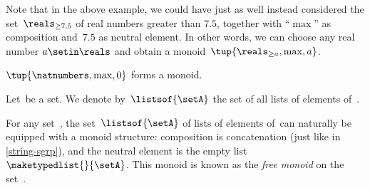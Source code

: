 \begin{remark}
    Note that in the above example, we could have just as well instead considered the set~$\reals_{\geq 7.5}$ of real numbers greater than $7.5$, together with ``$\max$'' as composition and~$7.5$ as neutral element.
    In other words, we can choose any real number $a \setin \reals$ and obtain a monoid~$\tup{\reals_{\geq a},\max, a}$.
\end{remark}

\begin{example}
    $\tup{\natnumbers, \max,0}$ forms a monoid.
\end{example}

\begin{definition}
    \label{def:set-of-lists}
    Let~\setA be a set.
    We denote by~$\listsof{\setA}$ the set of all lists of elements of~\setA.
\end{definition}

\begin{example}
    \label{exa:string-monoid}
    For any set~\setA, the set~$\listsof{\setA}$ of lists of elements of~\setA can naturally be equipped with a monoid structure: composition is concatenation (just like in \cref{string-sgrp}), and the neutral element is the empty list~$\maketypedlist{}{\setA}$.
    This monoid is known as the \emph{free monoid} on the set~\setA.
\end{example}

